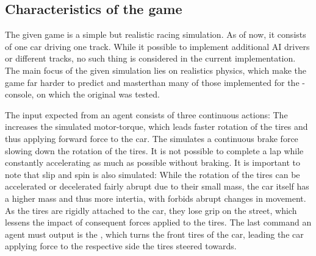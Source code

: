 \subsection{Characteristics of the game}



The given game is a simple but realistic racing simulation. As of now, it consists of one car driving one track. While it possible to implement additional AI drivers or different tracks, no such thing is considered in the current implementation. The main focus of the given simulation lies on realistics physics, which make the game far harder to predict and masterthan many of those implemented for the -console, on which the original  was tested.

The input expected from an agent consists of three continuous actions: The  increases the simulated motor-torque, which leads faster rotation of the tires and thus applying forward force to the car. The  simulates a continuous brake force slowing down the rotation of the tires. It is not possible to complete a lap while constantly accelerating as much as possible without braking. It is important to note that slip and spin is also simulated: While the rotation of the tires can be accelerated or decelerated fairly abrupt due to their small mass, the car itself has a higher mass and thus more intertia, with forbids abrupt changes in movement. As the tires are rigidly attached to the car, they lose grip on the street, which lessens the impact of consequent forces applied to the tires. The last command an agent must output is the , which turns the front tires of the car, leading the car applying force to the respective side the tires steered towards.


